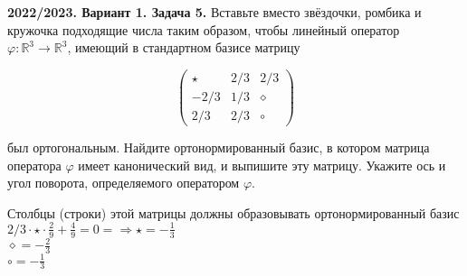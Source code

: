 \documentclass[a4paper]{article}
\begin{document}
\begin{tcolorbox}[colback=blue!20!white, colframe=black!100!black]
     \textbf{2022/2023. Вариант 1. Задача 5.} Вставьте вместо звёздочки, ромбика и кружочка подходящие числа таким образом, чтобы линейный оператор $\varphi: \mathbb{R}^{3} \rightarrow \mathbb{R}^{3}$, имеющий в стандартном базисе матрицу

$$
\left(\begin{array}{ccc}
\star & 2 / 3 & 2 / 3 \\
-2 / 3 & 1 / 3 & \diamond \\
2 / 3 & 2 / 3 & \circ
\end{array}\right)
$$

был ортогональным. Найдите ортонормированный базис, в котором матрица оператора $\varphi$ имеет канонический вид, и выпишите эту матрицу. Укажите ось и угол поворота, определяемого оператором $\varphi$.
\end{tcolorbox}
Столбцы (строки) этой матрицы должны образовывать ортонормированный базис\\[2mm]
\indent $2/3\cdot\star\cdot\displaystyle\frac{2}{9}+\frac{4}{9}=0=\Rightarrow \star=-\frac{1}{3}$\\[2mm]
\indent $\diamond=-\displaystyle\frac{2}{3}$\\[2mm]
\indent $\circ=-\displaystyle\frac{1}{3}$
\newpage
\end{document}
